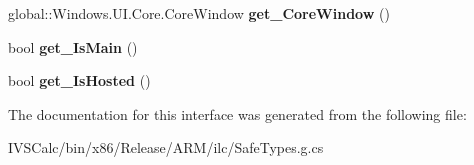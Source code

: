 \begin{DoxyCompactItemize}
global\+::\+Windows.\+U\+I.\+Core.\+Core\+Window {\bfseries get\+\_\+\+Core\+Window} ()
\item 
\mbox{\label{interface_windows_1_1_application_model_1_1_core_1_1_i_core_application_view_a74d261cd11b57aa6081977fb2a26c6bc}} 
bool {\bfseries get\+\_\+\+Is\+Main} ()
\item 
\mbox{\label{interface_windows_1_1_application_model_1_1_core_1_1_i_core_application_view_a703d9f7c90480a9a0d1f57d7b5332600}} 
bool {\bfseries get\+\_\+\+Is\+Hosted} ()
\end{DoxyCompactItemize}


The documentation for this interface was generated from the following file\+:\begin{DoxyCompactItemize}
\item 
I\+V\+S\+Calc/bin/x86/\+Release/\+A\+R\+M/ilc/Safe\+Types.\+g.\+cs\end{DoxyCompactItemize}

